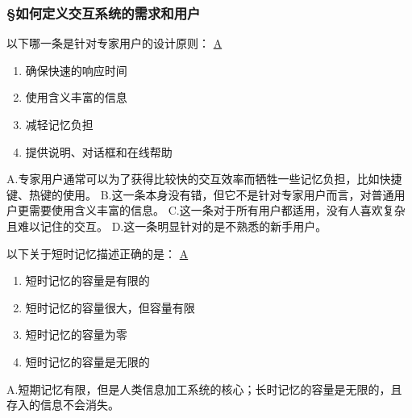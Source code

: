 \subsubsection*{\S 如何定义交互系统的需求和用户}
\setcounter{problemname}{0}

\begin{problem}
	‌以下哪一条是针对专家用户的设计原则：
	\uline{A}    
    \vspace{-0.8em}
    \begin{multicols}{2}
        \begin{enumerate}[label=\Alph*.]
            \item 确保快速的响应时间
            \item 使用含义丰富的信息
            \item 减轻记忆负担
            \item 提供说明、对话框和在线帮助
        \end{enumerate}
    \end{multicols}
    \vspace{-1em}
\end{problem}

\begin{solution}
A.专家用户通常可以为了获得比较快的交互效率而牺牲一些记忆负担，比如快捷键、热键的使用。  B.这一条本身没有错，但它不是针对专家用户而言，对普通用户更需要使用含义丰富的信息。  C.这一条对于所有用户都适用，没有人喜欢复杂且难以记住的交互。  D.这一条明显针对的是不熟悉的新手用户。
\end{solution}


\begin{problem}
	以下关于短时记忆描述正确的是：
	\uline{A}    
    \vspace{-0.8em}
    \begin{multicols}{2}
        \begin{enumerate}[label=\Alph*.]
            \item 短时记忆的容量是有限的
            \item 短时记忆的容量很大，但容量有限
            \item 短时记忆的容量为零
            \item 短时记忆的容量是无限的
        \end{enumerate}
    \end{multicols}
    \vspace{-1em}
\end{problem}

\begin{solution}
A.短期记忆有限，但是人类信息加工系统的核心；长时记忆的容量是无限的，且存入的信息不会消失。
\end{solution}


